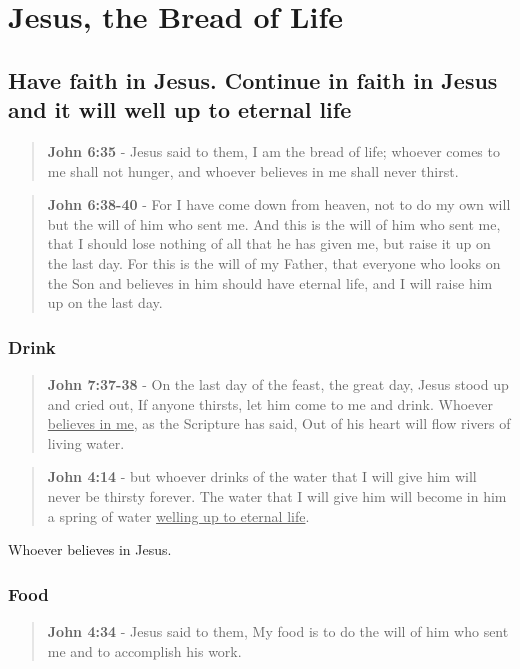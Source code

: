 \documentclass[11pt]{article}
\begin{document}
\section{Jesus, the Bread of Life}
\label{sec:orgedda409}
\subsection{Have faith in Jesus. Continue in faith in Jesus and it will well up to eternal life}
\label{sec:orgcc1e25c}
\begin{quote}
\textbf{John 6:35} - Jesus said to them, I am the bread of life; whoever comes to me shall not hunger, and whoever believes in me shall never thirst.
\end{quote}

\begin{quote}
\textbf{John 6:38-40} - For I have come down from heaven, not to do my own will but the will of him who sent me. And this is the will of him who sent me, that I should lose nothing of all that he has given me, but raise it up on the last day. For this is the will of my Father, that everyone who looks on the Son and believes in him should have eternal life, and I will raise him up on the last day.
\end{quote}

\subsubsection{Drink}
\label{sec:org038fb09}
\begin{quote}
\textbf{John 7:37-38} - On the last day of the feast, the great day, Jesus stood up and cried out, If anyone thirsts, let him come to me and drink. Whoever \uline{believes in me}, as the Scripture has said, Out of his heart will flow rivers of living water.
\end{quote}

\begin{quote}
\textbf{John 4:14} - but whoever drinks of the water that I will give him will never be thirsty forever. The water that I will give him will become in him a spring of water \uline{welling up to eternal life}.
\end{quote}

Whoever believes in Jesus.

\subsubsection{Food}
\label{sec:org0e9ff5e}
\begin{quote}
\textbf{John 4:34} - Jesus said to them, My food is to do the will of him who sent me and to accomplish his work.
\end{quote}
\end{document}
